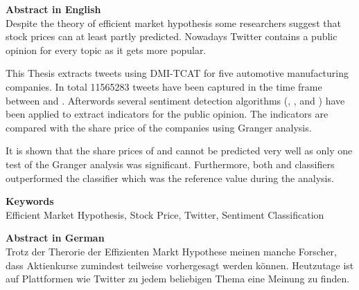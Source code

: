 
\newcommand*{\AbstractHead}[1]{%
{\noindent\color{header-blue}\Large\textbf{#1}}
\vspace{10pt}\\
}%

\newcommand*{\SomeSpace}{%
\vspace{\baselineskip}
}

\AbstractHead{Abstract in English}
\noindent
\normalsize
Despite the theory of efficient market hypothesis some researchers suggest that stock prices can at least partly predicted.
Nowadays Twitter contains a public opinion for every topic as it gets more popular.

This Thesis extracts tweets using DMI-TCAT for five automotive manufacturing companies.
In total \num{11565283} tweets have been captured in the time frame between  and .
Afterwords several sentiment detection algorithms (\tb{}, \nb{}, \me{} and \svm{}) have been applied to extract indicators for the public opinion.
The indicators are compared with the share price of the companies using Granger analysis.

It is shown that the share prices of \ford{} and \hyundai{} cannot be predicted very well as only one test of the Granger analysis was significant.
Furthermore, both \svm{} and \nb{} classifiers outperformed the \tb{} classifier which was the reference value during the analysis.


\SomeSpace
\AbstractHead{Keywords}
\normalsize
\noindent
Efficient Market Hypothesis, Stock Price, Twitter, Sentiment Classification

\glsresetall
\SomeSpace

\AbstractHead{Abstract in German}
\noindent
\normalsize
Trotz der Therorie der Effizienten Markt Hypothese meinen manche Forscher, dass Aktienkurse zumindest teilweise vorhergesagt werden können.
Heutzutage ist auf Plattformen wie Twitter zu jedem beliebigen Thema eine Meinung zu finden.

